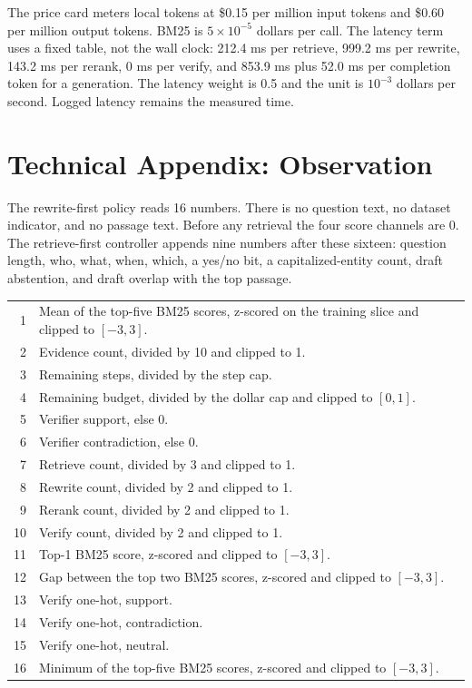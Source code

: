 \documentclass[letterpaper]{article} %
\begin{document}
The price card meters local tokens at \$0.15 per million input tokens and \$0.60 per million output tokens. BM25 is \(5\times 10^{-5}\) dollars per call. The latency term uses a fixed table, not the wall clock: 212.4 ms per retrieve, 999.2 ms per rewrite, 143.2 ms per rerank, 0 ms per verify, and 853.9 ms plus 52.0 ms per completion token for a generation. The latency weight is 0.5 and the unit is \(10^{-3}\) dollars per second. Logged latency remains the measured time.

\FloatBarrier
\section{Technical Appendix: Observation}
The rewrite-first policy reads 16 numbers. There is no question text, no dataset indicator, and no passage text. Before any retrieval the four score channels are 0. The retrieve-first controller appends nine numbers after these sixteen: question length, who, what, when, which, a yes/no bit, a capitalized-entity count, draft abstention, and draft overlap with the top passage.

\begin{center}
\small
\setlength{\tabcolsep}{0.5em}
\begin{tabular}{@{}rp{}@{}}
1 & Mean of the top-five BM25 scores, z-scored on the training slice and clipped to \([-3, 3]\). \\
2 & Evidence count, divided by 10 and clipped to 1. \\
3 & Remaining steps, divided by the step cap. \\
4 & Remaining budget, divided by the dollar cap and clipped to \([0, 1]\). \\
5 & Verifier support, else 0. \\
6 & Verifier contradiction, else 0. \\
7 & Retrieve count, divided by 3 and clipped to 1. \\
8 & Rewrite count, divided by 2 and clipped to 1. \\
9 & Rerank count, divided by 2 and clipped to 1. \\
10 & Verify count, divided by 2 and clipped to 1. \\
11 & Top-1 BM25 score, z-scored and clipped to \([-3, 3]\). \\
12 & Gap between the top two BM25 scores, z-scored and clipped to \([-3, 3]\). \\
13 & Verify one-hot, support. \\
14 & Verify one-hot, contradiction. \\
15 & Verify one-hot, neutral. \\
16 & Minimum of the top-five BM25 scores, z-scored and clipped to \([-3, 3]\).
\end{tabular}
\end{center}
\end{document}
